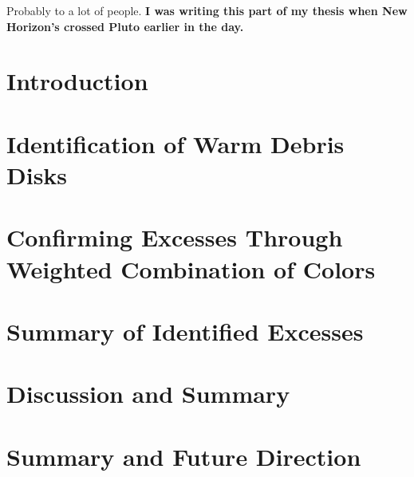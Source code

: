 \documentclass[phd,bottom,nosig]{usbthesis}
\begin{document}
\begin{dedication}
   Probably to a lot of people. \textbf{I was writing this part of my thesis when New Horizon's crossed Pluto earlier in the day.}
\end{dedication}

\tableofcontents %
\listoffigures %
\listoftables %

\begin{acknowledgements}

\end{acknowledgements}

\pagestyle{thesis}



\newpage
{}

\chapter{Introduction} \label{chap:intro}


\chapter{Identification of Warm Debris Disks} \label{chap:iddisks}

\clearpage
%


\chapter{Confirming Excesses Through Weighted Combination of Colors}\label{chap:confirm}

\chapter{Summary of Identified Excesses} \label{chap:summary}

\chapter{Discussion and Summary} \label{chap:disc_and_summary}

\chapter{Summary and Future Direction} \label{chap:future}




%


%



%
%



\end{document}
